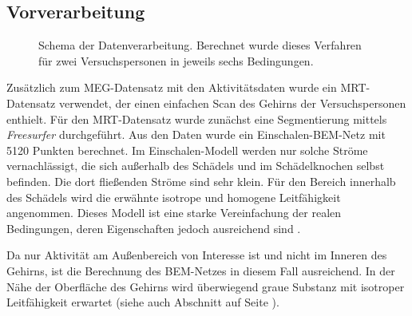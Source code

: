 \documentclass[doc,a4paper,12pt]{apa6}
\makeatletter
\DeclareRobustCommand*{\nameref}[1]{%
      \glqq{\myorg@nameref{#1}}\grqq%
    }%
\makeatother
\begin{document}
\subsection{Vorverarbeitung}

\begin{figure}
  \centering
  \setlength{\fboxsep}{5mm}
  \vspace*{3mm}
  \caption[Schema der Datenverarbeitung]{Schema der Datenverarbeitung. Berechnet wurde dieses Verfahren für zwei Versuchspersonen in jeweils sechs Bedingungen.}
  \label{img:verfahren}
\end{figure}

Zusätzlich zum MEG-Datensatz mit den Aktivitätsdaten wurde ein MRT-Datensatz verwendet, der einen einfachen Scan des Gehirns der Versuchspersonen enthielt. Für den MRT-Datensatz wurde zunächst eine Segmentierung mittels \emph{Freesurfer} durchgeführt. Aus den Daten wurde ein Einschalen-BEM-Netz mit 5120 Punkten berechnet. Im Einschalen-Modell werden nur solche Ströme vernachlässigt, die sich außerhalb des Schädels und im Schädelknochen selbst befinden. Die dort fließenden Ströme sind sehr klein. Für den Bereich innerhalb des Schädels wird die erwähnte isotrope und homogene Leitfähigkeit angenommen. Dieses Modell ist eine starke Vereinfachung der realen Bedingungen, deren Eigenschaften jedoch ausreichend sind \parencite{stenroos2014comparison}.

Da nur Aktivität am Außenbereich von Interesse ist und nicht im Inneren des Gehirns, ist die Berechnung des BEM-Netzes in diesem Fall ausreichend. In der Nähe der Oberfläche des Gehirns wird überwiegend graue Substanz mit isotroper Leitfähigkeit erwartet (siehe auch Abschnitt \nameref{sec:segment} auf Seite \pageref{sec:segment}).
\end{document}
